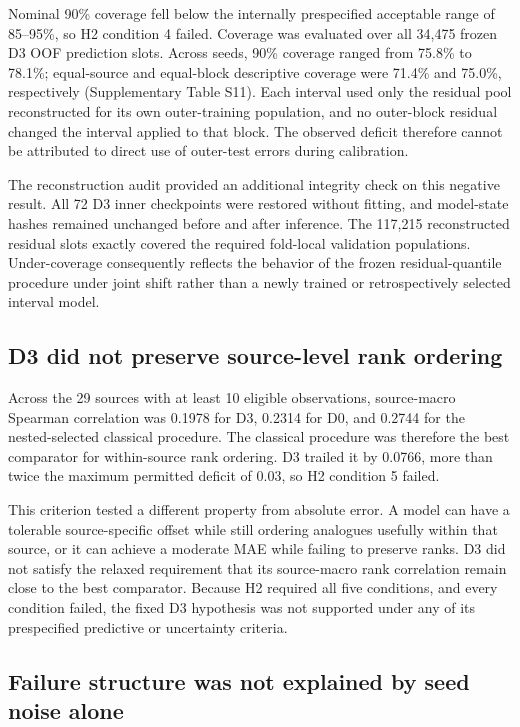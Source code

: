 \documentclass[referee,lineno,pdflatex,Numbered,sn-basic]{sn-jnl}
\begin{document}
Nominal 90\% coverage fell below the internally prespecified acceptable range of 85--95\%, so H2 condition 4 failed. Coverage was evaluated over all 34,475 frozen D3 OOF prediction slots. Across seeds, 90\% coverage ranged from 75.8\% to 78.1\%; equal-source and equal-block descriptive coverage were 71.4\% and 75.0\%, respectively (Supplementary Table S11). Each interval used only the residual pool reconstructed for its own outer-training population, and no outer-block residual changed the interval applied to that block. The observed deficit therefore cannot be attributed to direct use of outer-test errors during calibration.

The reconstruction audit provided an additional integrity check on this negative result. All 72 D3 inner checkpoints were restored without fitting, and model-state hashes remained unchanged before and after inference. The 117,215 reconstructed residual slots exactly covered the required fold-local validation populations. Under-coverage consequently reflects the behavior of the frozen residual-quantile procedure under joint shift rather than a newly trained or retrospectively selected interval model.

\subsection{D3 did not preserve source-level rank ordering}

Across the 29 sources with at least 10 eligible observations, source-macro Spearman correlation was 0.1978 for D3, 0.2314 for D0, and 0.2744 for the nested-selected classical procedure. The classical procedure was therefore the best comparator for within-source rank ordering. D3 trailed it by 0.0766, more than twice the maximum permitted deficit of 0.03, so H2 condition 5 failed.

This criterion tested a different property from absolute error. A model can have a tolerable source-specific offset while still ordering analogues usefully within that source, or it can achieve a moderate MAE while failing to preserve ranks. D3 did not satisfy the relaxed requirement that its source-macro rank correlation remain close to the best comparator. Because H2 required all five conditions, and every condition failed, the fixed D3 hypothesis was not supported under any of its prespecified predictive or uncertainty criteria.

\subsection{Failure structure was not explained by seed noise alone}
\end{document}

